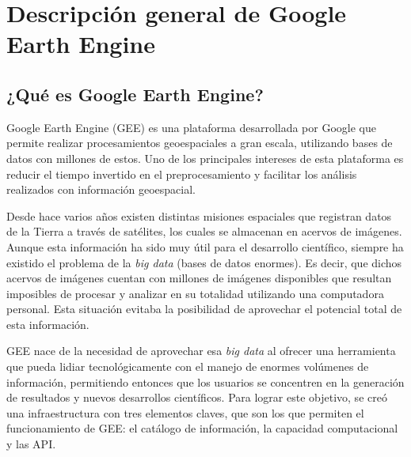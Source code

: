 \documentclass[
  12pt,
  letterpaper,
  twoside]{book}
\begin{document}
\hypertarget{descripciuxf3n-general-de-google-earth-engine}{%
\section{Descripción general de Google Earth Engine}\label{descripciuxf3n-general-de-google-earth-engine}}

\hypertarget{quuxe9-es-google-earth-engine}{%
\subsection*{¿Qué es Google Earth Engine?}\label{quuxe9-es-google-earth-engine}}

Google Earth Engine (GEE) es una plataforma desarrollada por Google que permite realizar procesamientos geoespaciales a gran escala, utilizando bases de datos con millones de estos. Uno de los principales intereses de esta plataforma es reducir el tiempo invertido en el preprocesamiento y facilitar los análisis realizados con información geoespacial.

Desde hace varios años existen distintas misiones espaciales que registran datos de la Tierra a través de satélites, los cuales se almacenan en acervos de imágenes. Aunque esta información ha sido muy útil para el desarrollo científico, siempre ha existido el problema de la \emph{big data} (bases de datos enormes). Es decir, que dichos acervos de imágenes cuentan con millones de imágenes disponibles que resultan imposibles de procesar y analizar en su totalidad utilizando una computadora personal. Esta situación evitaba la posibilidad de aprovechar el potencial total de esta información.

GEE nace de la necesidad de aprovechar esa \emph{big data} al ofrecer una herramienta que pueda lidiar tecnológicamente con el manejo de enormes volúmenes de información, permitiendo entonces que los usuarios se concentren en la generación de resultados y nuevos desarrollos científicos. Para lograr este objetivo, se creó una infraestructura con tres elementos claves, que son los que permiten el funcionamiento de GEE: el catálogo de información, la capacidad computacional y las API.
\end{document}
